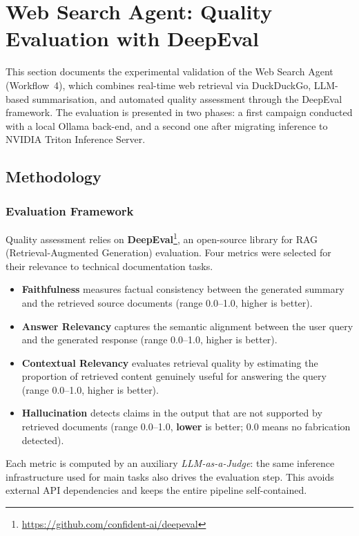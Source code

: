 \section{Web Search Agent: Quality Evaluation with DeepEval}

This section documents the experimental validation of the Web Search Agent (Workflow~4), which combines real-time web retrieval via DuckDuckGo, LLM-based summarisation, and automated quality assessment through the DeepEval framework. The evaluation is presented in two phases: a first campaign conducted with a local Ollama back-end, and a second one after migrating inference to NVIDIA Triton Inference Server.

\subsection{Methodology}

\subsubsection{Evaluation Framework}
Quality assessment relies on \textbf{DeepEval}\footnote{\url{https://github.com/confident-ai/deepeval}}, an open-source library for RAG (Retrieval-Augmented Generation) evaluation. Four metrics were selected for their relevance to technical documentation tasks.

\begin{itemize}
    \item \textbf{Faithfulness} measures factual consistency between the generated summary and the retrieved source documents (range 0.0--1.0, higher is better).
    \item \textbf{Answer Relevancy} captures the semantic alignment between the user query and the generated response (range 0.0--1.0, higher is better).
    \item \textbf{Contextual Relevancy} evaluates retrieval quality by estimating the proportion of retrieved content genuinely useful for answering the query (range 0.0--1.0, higher is better).
    \item \textbf{Hallucination} detects claims in the output that are not supported by retrieved documents (range 0.0--1.0, \textbf{lower} is better; 0.0 means no fabrication detected).
\end{itemize}

Each metric is computed by an auxiliary \emph{LLM-as-a-Judge}: the same inference infrastructure used for main tasks also drives the evaluation step. This avoids external API dependencies and keeps the entire pipeline self-contained.


